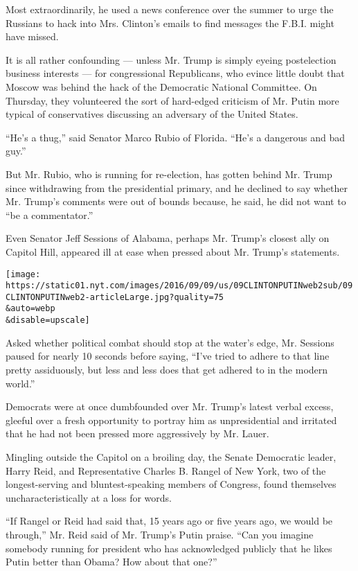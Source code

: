 Most extraordinarily, he used a news conference over the summer to urge
the Russians to hack into Mrs. Clinton's emails to find messages the
F.B.I. might have missed.

It is all rather confounding --- unless Mr. Trump is simply eyeing
postelection business interests --- for congressional Republicans, who
evince little doubt that Moscow was behind the hack of the Democratic
National Committee. On Thursday, they volunteered the sort of hard-edged
criticism of Mr. Putin more typical of conservatives discussing an
adversary of the United States.

``He's a thug,'' said Senator Marco Rubio of Florida. ``He's a dangerous
and bad guy.''

But Mr. Rubio, who is running for re-election, has gotten behind Mr.
Trump since withdrawing from the presidential primary, and he declined
to say whether Mr. Trump's comments were out of bounds because, he said,
he did not want to ``be a commentator.''

Even Senator Jeff Sessions of Alabama, perhaps Mr. Trump's closest ally
on Capitol Hill, appeared ill at ease when pressed about Mr. Trump's
statements.

\texttt{[image: https://static01.nyt.com/images/2016/09/09/us/09CLINTONPUTINweb2sub/09CLINTONPUTINweb2-articleLarge.jpg?quality=75\\\&auto=webp\\\&disable=upscale]}

Asked whether political combat should stop at the water's edge, Mr.
Sessions paused for nearly 10 seconds before saying, ``I've tried to
adhere to that line pretty assiduously, but less and less does that get
adhered to in the modern world.''

Democrats were at once dumbfounded over Mr. Trump's latest verbal
excess, gleeful over a fresh opportunity to portray him as
unpresidential and irritated that he had not been pressed more
aggressively by Mr. Lauer.

Mingling outside the Capitol on a broiling day, the Senate Democratic
leader, Harry Reid, and Representative Charles B. Rangel of New York,
two of the longest-serving and bluntest-speaking members of Congress,
found themselves uncharacteristically at a loss for words.

``If Rangel or Reid had said that, 15 years ago or five years ago, we
would be through,'' Mr. Reid said of Mr. Trump's Putin praise. ``Can you
imagine somebody running for president who has acknowledged publicly
that he likes Putin better than Obama? How about that one?''

